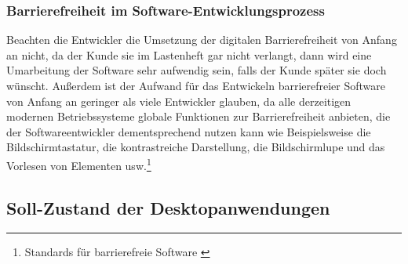 \subsubsection{Barrierefreiheit im Software-Entwicklungsprozess}
Beachten die Entwickler die Umsetzung der digitalen Barrierefreiheit von Anfang an nicht, da der Kunde sie im Lastenheft gar nicht verlangt, dann wird eine Umarbeitung der Software sehr aufwendig sein, falls der Kunde später sie doch wünscht. Außerdem ist der Aufwand für das Entwickeln barrierefreier Software von Anfang an geringer als viele Entwickler glauben, da alle  derzeitigen modernen Betriebssysteme globale Funktionen zur Barrierefreiheit anbieten, die der Softwareentwickler dementsprechend nutzen kann wie Beispielsweise die Bildschirmtastatur, die kontrastreiche Darstellung, die Bildschirmlupe und das Vorlesen von Elementen usw.\footnote{Standards für barrierefreie Software \cite{DEVINSIDER}}


\subsection{Soll-Zustand der Desktopanwendungen}
\label{subsec: Soll-Zustand der Desktopanwendungen}
